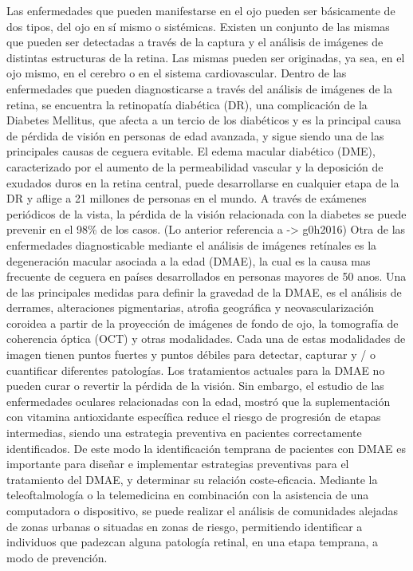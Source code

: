 Las enfermedades que pueden manifestarse en el ojo pueden ser b\'asicamente de dos tipos, del ojo en s\'i mismo o sist\'emicas. Existen un conjunto de las mismas que pueden ser detectadas a trav\'es de la captura y el an\'alisis de im\'agenes de distintas estructuras de la retina. Las mismas pueden ser originadas, ya sea, en el ojo mismo, en el cerebro o en el sistema cardiovascular.
Dentro de las enfermedades que pueden diagnosticarse a trav\'es del an\'alisis de im\'agenes de la retina, se encuentra la retinopat\'ia diab\'etica (DR), una complicaci\'on de la Diabetes Mellitus, que afecta a un tercio de los diab\'eticos  y es la principal causa de p\'erdida de visi\'on en personas de edad avanzada,  y sigue siendo una de las principales causas de ceguera evitable. El edema macular diab\'etico (DME), caracterizado por el aumento de la permeabilidad vascular y la deposici\'on de exudados duros en la retina central, puede desarrollarse en cualquier etapa de la DR y aflige a 21 millones de personas en el mundo.  A trav\'es de ex\'amenes peri\'odicos de la vista, la p\'erdida de la visi\'on relacionada con la diabetes se puede prevenir en el 98\% de los casos.
(Lo anterior referencia a -> g0h2016) 
Otra de las enfermedades diagnosticable mediante el an\'alisis de im\'agenes ret\'inales es la degeneraci\'on macular asociada a la edad (DMAE), la cual es la causa mas frecuente de ceguera en pa\'ises desarrollados en personas mayores de 50 anos. Una de las principales medidas para definir la gravedad de la DMAE, es el an\'alisis de derrames, alteraciones pigmentarias, atrofia geogr\'afica  y neovascularizaci\'on coroidea a partir de la proyecci\'on de im\'agenes de fondo de ojo, la tomograf\'ia de coherencia \'optica (OCT) y otras modalidades. Cada una de estas modalidades de imagen tienen puntos fuertes y puntos d\'ebiles para detectar, capturar y / o cuantificar diferentes patolog\'ias. Los tratamientos actuales para la DMAE no pueden curar o revertir la p\'erdida de la visi\'on. Sin embargo, el estudio de las enfermedades oculares relacionadas con la edad, mostr\'o que la suplementaci\'on con vitamina antioxidante espec\'ifica reduce el riesgo de progresi\'on de etapas intermedias, siendo una estrategia preventiva en pacientes correctamente identificados. De este modo la identificaci\'on temprana de pacientes con DMAE es importante para diseñar e implementar estrategias preventivas para el tratamiento del DMAE, y determinar su relaci\'on coste-eficacia. Mediante la teleoftalmolog\'ia o la telemedicina en combinaci\'on con la asistencia de una computadora o dispositivo, se puede realizar el an\'alisis de comunidades alejadas de zonas urbanas o situadas en zonas de riesgo, permitiendo identificar a individuos que padezcan alguna patolog\'ia retinal, en una etapa temprana, a modo de prevenci\'on. \cite{kanagasingam2014progress}


